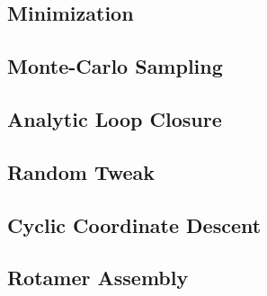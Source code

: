 \subsection{Minimization}
\label{subsection:minimization}


\subsection{Monte-Carlo Sampling}
\label{subsection:monte_carlo}


\subsection{Analytic Loop Closure}
\label{subsection:analytic_loop_closure}


\subsection{Random Tweak}
\label{subsection:tweak}


\subsection{Cyclic Coordinate Descent}
\label{subsection:cyclic_coordinate_descent}


\subsection{Rotamer Assembly}
\label{subsection:rotamer_assembly}

